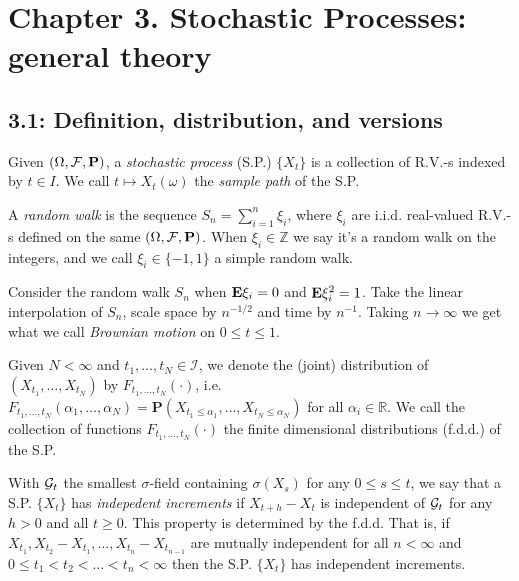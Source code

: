 \section*{Chapter 3. Stochastic Processes: general theory}
\subsection*{3.1: Definition, distribution, and versions}
\begin{definition*}
Given $(\Omega,\mathcal{F},\mathbf P)$, a \emph{stochastic process} (S.P.) $\{X_t\}$ is a collection of R.V.-s indexed by $t\in I$. We call $t \mapsto X_t(\omega)$ the \emph{sample path} of the S.P.
\end{definition*}

\begin{definition*}
A \emph{random walk} is the sequence $S_n = \sum_{i=1}^n \xi_i$, where $\xi_i$ are i.i.d. real-valued R.V.-s defined on the same $(\Omega,\mathcal{F},\mathbf P)$. When $\xi_i \in \mathbb Z$ we say it's a random walk on the integers, and we call $\xi_i\in\{-1,1\}$ a simple random walk.
\end{definition*}

\begin{theorem*}
Consider the random walk $S_n$ when $\mathbf{E}\xi_i=0$ and $\mathbf{E}\xi_i^2=1$. Take the linear interpolation of $S_n$, scale space by $n^{-1/2}$ and time by $n^{-1}$. Taking $n\to\infty$ we get what we call \emph{Brownian motion} on $0\leq t \leq 1$.
\end{theorem*}

\begin{definition*} Given $N < \infty$ and $t_1,\dots,t_N\in \mathcal I$, we denote the (joint) distribution of $(X_{t_1},\dots,X_{t_N})$ by $F_{t_1,\dots,t_N}(\cdot)$, i.e. $F_{t_1,\dots,t_N}(\alpha_1,\dots,\alpha_N) = \mathbf P(X_{t_1 \leq \alpha_1},\dots,X_{t_N\leq\alpha_N})$ for all $\alpha_i\in\mathbb R$. We call the collection of functions $F_{t_1,\dots,t_N}(\cdot)$ the finite dimensional distributions (f.d.d.) of the S.P.
\end{definition*}

\begin{definition*}
With $\mathcal{G}_t$ the smallest $\sigma$-field containing $\sigma(X_s)$ for any $0\leq s\leq t$, we say that a S.P. $\{X_t\}$ has \emph{indepedent increments} if $X_{t+h}-X_t$ is independent of $\mathcal{G}_t$ for any $h>0$ and all $t \geq 0$. This property is determined by the f.d.d. That is, if $X_{t_1}, X_{t_2}-X_{t_1},\dots,X_{t_n} - X_{t_{n-1}}$ are mutually independent for all $n < \infty$ and $0 \leq t_1 < t_2 < \dots < t_n < \infty$ then the S.P. $\{X_t\}$ has independent increments.
\end{definition*}

